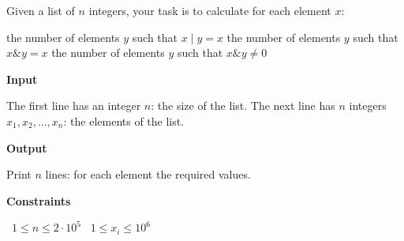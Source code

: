Given a list of $n$ integers, your task is to calculate for each element $x$:

the number of elements $y$ such that $x \mid y = x$
the number of elements $y$ such that $x \mathrel{\&} y = x$
the number of elements $y$ such that $x \mathrel{\&} y \neq 0$

\vspace{0.3cm}\noindent\textbf{Input}

The first line has an integer $n$: the size of the list.
The next line has $n$ integers $x_1,x_2,\dots,x_n$: the elements of the list.

\vspace{0.3cm}\noindent\textbf{Output}

Print $n$ lines: for each element the required values.

\vspace{0.3cm}\noindent\textbf{Constraints}

\textbullet\ $1 \le n \le 2 \cdot 10^5$
\textbullet\ $1 \le x_i \le 10^6$
